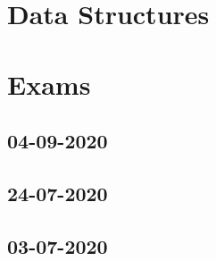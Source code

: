 \documentclass{book}
\begin{document}
  \chapter{Data Structures}
  

  \chapter{Exams}
  \section{04-09-2020}
  

  \section{24-07-2020}
  

  \section{03-07-2020}
  
\end{document}
